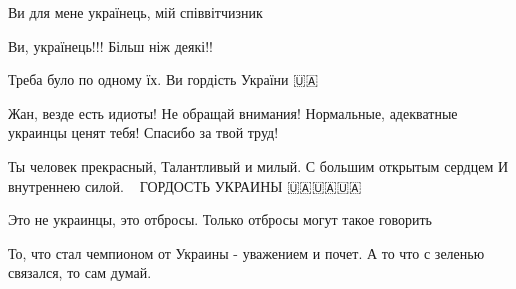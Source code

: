 \begin{itemize}
Ви для мене українець, мій співвітчизник

 
Ви, українець!!! Більш ніж деякі!!

 
Треба було по одному їх. Ви гордість України 🇺🇦💪

 
Жан, везде есть идиоты! Не обращай внимания! Нормальные, адекватные украинцы ценят тебя! Спасибо за твой труд!

 
Ты человек прекрасный,
Талантливый и милый.
С большим открытым сердцем
И внутреннею силой.🐻🥇🥇🥇ГОРДОСТЬ УКРАИНЫ 🇺🇦🇺🇦🇺🇦

 
Это не украинцы, это отбросы. Только отбросы могут такое говорить

 
То, что стал чемпионом от Украины - уважением и почет. А то что с зеленью связался, то сам думай.


\end{itemize}

